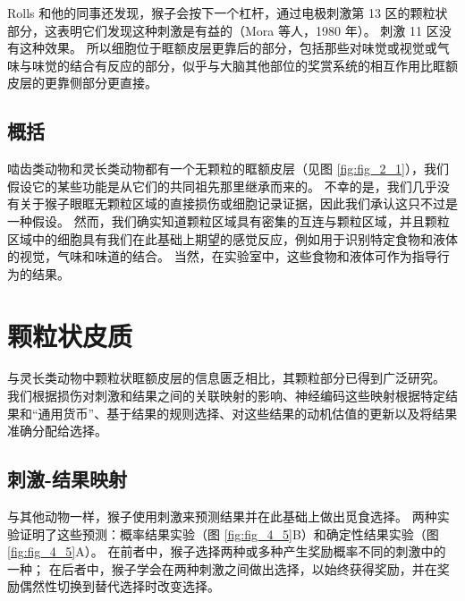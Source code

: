 Rolls 和他的同事还发现，猴子会按下一个杠杆，通过电极刺激第 13 区的颗粒状部分，这表明它们发现这种刺激是有益的（Mora 等人，1980 年）。
刺激 11 区没有这种效果。
所以细胞位于眶额皮层更靠后的部分，包括那些对味觉或视觉或气味与味觉的结合有反应的部分，似乎与大脑其他部位的奖赏系统的相互作用比眶额皮层的更靠侧部分更直接。\par



\subsection{概括}

啮齿类动物和灵长类动物都有一个无颗粒的眶额皮层（见图 \ref{fig:fig_2_1}），我们假设它的某些功能是从它们的共同祖先那里继承而来的。
不幸的是，我们几乎没有关于猴子眼眶无颗粒区域的直接损伤或细胞记录证据，因此我们承认这只不过是一种假设。
然而，我们确实知道颗粒区域具有密集的互连与颗粒区域，并且颗粒区域中的细胞具有我们在此基础上期望的感觉反应，例如用于识别特定食物和液体的视觉，气味和味道的结合。
当然，在实验室中，这些食物和液体可作为指导行为的结果。\par



\section{颗粒状皮质}

与灵长类动物中颗粒状眶额皮层的信息匮乏相比，其颗粒部分已得到广泛研究。
我们根据损伤对刺激和结果之间的关联映射的影响、神经编码这些映射根据特定结果和“通用货币”、基于结果的规则选择、对这些结果的动机估值的更新以及将结果准确分配给选择。



\subsection{刺激-结果映射}

与其他动物一样，猴子使用刺激来预测结果并在此基础上做出觅食选择。
两种实验证明了这些预测：概率结果实验（图 \ref{fig:fig_4_5}B）和确定性结果实验（图 \ref{fig:fig_4_5}A）。
在前者中，猴子选择两种或多种产生奖励概率不同的刺激中的一种；
在后者中，猴子学会在两种刺激之间做出选择，以始终获得奖励，并在奖励偶然性切换到替代选择时改变选择。\par


